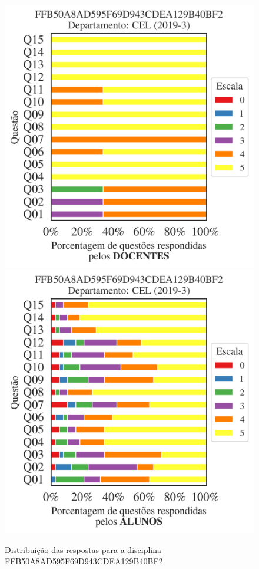\documentclass[a4paper,10pt]{article}
\begin{document}
\begin{figure}[h]
\centering
\includegraphics[width=0.485\linewidth]{analise_disciplina_departamento_CEL_FFB50A8AD595F69D943CDEA129B40BF2_docentes.png}
\includegraphics[width=0.485\linewidth]{analise_disciplina_departamento_CEL_FFB50A8AD595F69D943CDEA129B40BF2_alunos.png}
\caption{\label{fig:analise_geral_departamento}                Distribuição das respostas para a disciplina FFB50A8AD595F69D943CDEA129B40BF2. }
\end{figure}
\end{document}
